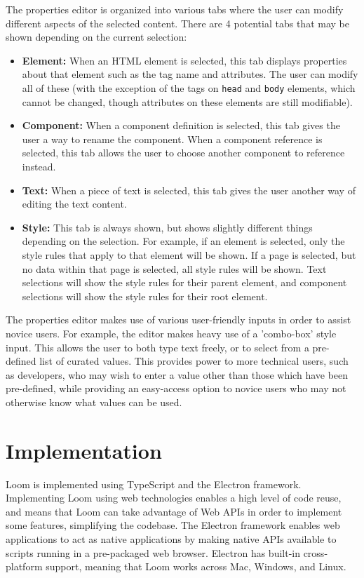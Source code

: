 \documentclass[conference, letterpaper]{IEEEtran}
\begin{document}
The properties editor is organized into various tabs where the user can modify different aspects of the selected content. There are 4 potential tabs that may be shown depending on the current selection:
\begin{itemize}
  \item \textbf{Element:} When an HTML element is selected, this tab displays properties about that element such as the tag name and attributes. The user can modify all of these (with the exception of the tags on \texttt{head} and \texttt{body} elements, which cannot be changed, though attributes on these elements are still modifiable).
  \item \textbf{Component:} When a component definition is selected, this tab gives the user a way to rename the component. When a component reference is selected, this tab allows the user to choose another component to reference instead.
  \item \textbf{Text:} When a piece of text is selected, this tab gives the user another way of editing the text content.
  \item \textbf{Style:} This tab is always shown, but shows slightly different things depending on the selection. For example, if an element is selected, only the style rules that apply to that element will be shown. If a page is selected, but no data within that page is selected, all style rules will be shown. Text selections will show the style rules for their parent element, and component selections will show the style rules for their root element.
\end{itemize}

The properties editor makes use of various user-friendly inputs in order to assist novice users. For example, the editor makes heavy use of a 'combo-box' style input. This allows the user to both type text freely, or to select from a pre-defined list of curated values. This provides power to more technical users, such as developers, who may wish to enter a value other than those which have been pre-defined, while providing an easy-access option to novice users who may not otherwise know what values can be used.

\section{Implementation}
Loom is implemented using TypeScript\cite{TypeScript} and the Electron\cite{Electron} framework. Implementing Loom using web technologies enables a high level of code reuse, and means that Loom can take advantage of Web APIs in order to implement some features, simplifying the codebase. The Electron framework enables web applications to act as native applications by making native APIs available to scripts running in a pre-packaged web browser. Electron has built-in cross-platform support, meaning that Loom works across Mac, Windows, and Linux.
\end{document}
